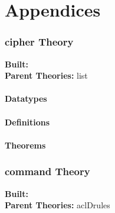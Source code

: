 \documentclass[10pt,twoside]{article}
\begin{document}
\newpage{}

\part*{Appendices}
\label{part:appendicies}

\HOLpagestyle

\section{cipher Theory}
\begin{flushleft}
\textbf{Built:} \HOLcipherDate \\[2pt]
\textbf{Parent Theories:} list
\end{flushleft}

\subsection{Datatypes}

\HOLcipherDatatypes

\subsection{Definitions}

\HOLcipherDefinitions

\subsection{Theorems}

\HOLcipherTheorems

\section{command Theory}
\begin{flushleft}
\textbf{Built:} \HOLcommandDate \\[2pt]
\textbf{Parent Theories:} aclDrules
\end{flushleft}
\end{document}
